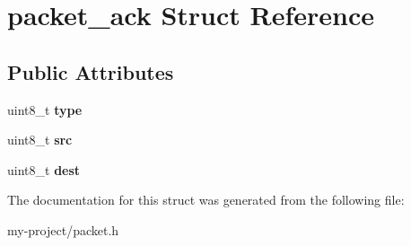 \hypertarget{structpacket__ack}{}\section{packet\+\_\+ack Struct Reference}
\label{structpacket__ack}
\subsection*{Public Attributes}
\begin{DoxyCompactItemize}
\item 
\mbox{\label{structpacket__ack_a00f27951982c081dfd896f15949fb20a}} 
uint8\+\_\+t {\bfseries type}
\item 
\mbox{\label{structpacket__ack_af2f14db936c92b6d2c6c8de212adcd5d}} 
uint8\+\_\+t {\bfseries src}
\item 
\mbox{\label{structpacket__ack_a4747fe5114b1ec502c7de8fa34e20faf}} 
uint8\+\_\+t {\bfseries dest}
\end{DoxyCompactItemize}


The documentation for this struct was generated from the following file\+:\begin{DoxyCompactItemize}
\item 
my-\/project/packet.\+h\end{DoxyCompactItemize}
